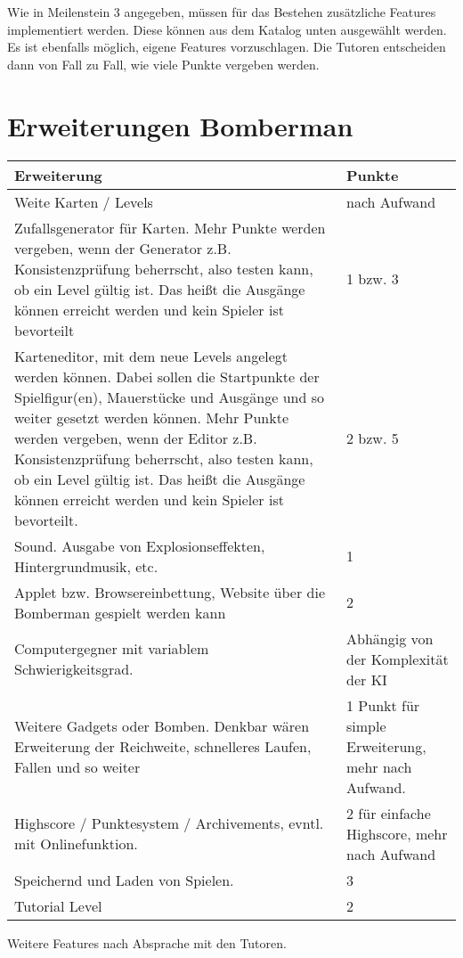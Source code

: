 \documentclass{programmierpraktikum}
\subtitle{Bomberman}
\begin{document}
\maketitle
Wie in Meilenstein 3 angegeben, müssen für das Bestehen zusätzliche Features implementiert werden. Diese können aus dem Katalog unten ausgewählt werden. Es ist ebenfalls möglich, eigene Features vorzuschlagen. Die Tutoren entscheiden dann von Fall zu Fall, wie viele Punkte vergeben werden.
\section{Erweiterungen Bomberman}

\begin{longtable}{|p{}|p{}|}
\hline
\textbf{Erweiterung} & \textbf{Punkte} \\ \hline
Weite Karten / Levels & nach Aufwand \\ \hline
Zufallsgenerator für Karten. Mehr Punkte werden vergeben, wenn der Generator z.B. Konsistenzprüfung beherrscht, also testen kann, ob ein Level gültig ist. Das heißt die Ausgänge können erreicht werden und kein Spieler ist bevorteilt & 1 bzw. 3 \\ \hline
Karteneditor, mit dem neue Levels angelegt werden können. Dabei sollen die Startpunkte der Spielfigur(en), Mauerstücke und Ausgänge und so weiter gesetzt werden können. Mehr Punkte werden vergeben, wenn der Editor z.B. Konsistenzprüfung beherrscht, also testen kann, ob ein Level gültig ist. Das heißt die Ausgänge können erreicht werden und kein Spieler ist bevorteilt. & 2 bzw. 5 \\ \hline
Sound. Ausgabe von Explosionseffekten, Hintergrundmusik, etc. & 1 \\ \hline
Applet bzw. Browsereinbettung, Website über die Bomberman gespielt werden kann & 2 \\ \hline
Computergegner mit variablem Schwierigkeitsgrad. & Abhängig von der Komplexität der KI \\ \hline
Weitere Gadgets oder Bomben. Denkbar wären Erweiterung der Reichweite, schnelleres Laufen, Fallen und so weiter &  1 Punkt für simple Erweiterung, mehr nach Aufwand. \\ \hline
Highscore / Punktesystem / Archivements, evntl. mit Onlinefunktion. & 2 für einfache Highscore, mehr nach Aufwand \\ \hline
Speichernd und Laden von Spielen. & 3 \\ \hline
Tutorial Level & 2 \\ \hline
\end{longtable}

Weitere Features nach Absprache mit den Tutoren.
\end{document}
